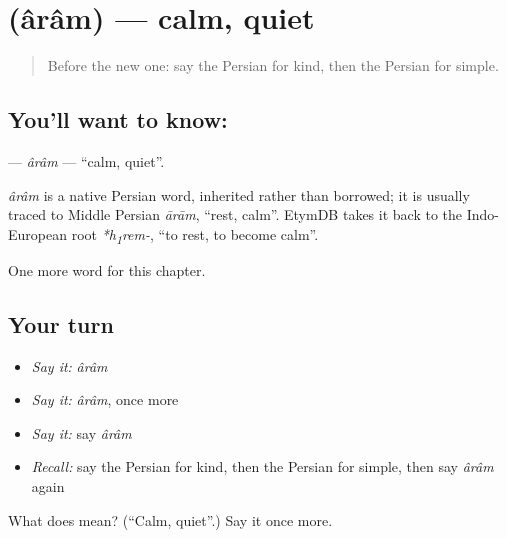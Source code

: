 \section[\texorpdfstring{\fa{آرام} (ârâm)}{آرام (ârâm)}]{ (ârâm) — calm, quiet}

\label{lesson:FA-C128-aram}



\begin{quote}
Before the new one: say the Persian for kind, then the Persian for simple.
\end{quote}

\subsection*{You'll want to know: }
\textbf{} — \emph{ârâm} — \textquotedblleft{}calm, quiet\textquotedblright{}.

\begin{cousinweb}
\emph{ârâm} is a native Persian word, inherited rather than borrowed; it is usually traced to Middle Persian \emph{ārām}, \textquotedblleft{}rest, calm\textquotedblright{}. EtymDB takes it back to the Indo-European root \emph{*h\textsubscript{1}rem-}, \textquotedblleft{}to rest, to become calm\textquotedblright{}.
\end{cousinweb}

\begin{grammarlens}[title={What you've built}]
One more word for this chapter.
\end{grammarlens}

\subsection*{Your turn}
\begin{itemize}
\raggedright
  \item \emph{Say it:} \emph{ârâm}
  \item \emph{Say it:} \emph{ârâm}, once more
  \item \emph{Say it:} say \emph{ârâm}
  \item \emph{Recall:} say the Persian for kind, then the Persian for simple, then say \emph{ârâm} again
\end{itemize}

\begin{tcolorbox}[breakable,colback=teal!4,colframe=teal!35!black,title={Before you move on}]
What does  mean? (\textquotedblleft{}Calm, quiet\textquotedblright{}.) Say it once more.
\end{tcolorbox}
